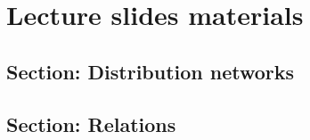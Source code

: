
\section{Lecture slides materials}

\subsection{Section: Distribution networks}   


\subsection{Section: Relations}  


\begin{equation}\label{slides_session2_76}

\end{equation}
 \begin{equation}\label{slides_session2_77}

\end{equation}
\begin{equation}\label{slides_session2_78}

\end{equation}
 \begin{equation}\label{slides_session2_79}

\end{equation}
 \begin{equation}\label{slides_session2_80}

\end{equation}
 \begin{equation}\label{slides_session2_81}

\end{equation}
\begin{equation}\label{slides_session2_82}

\end{equation}
 \begin{equation}\label{slides_session2_83}

\end{equation}
\begin{equation}\label{slides_session2_84}

\end{equation}
 \begin{equation}\label{slides_session2_85}

\end{equation}
\begin{equation}\label{slides_session2_86}

\end{equation}
